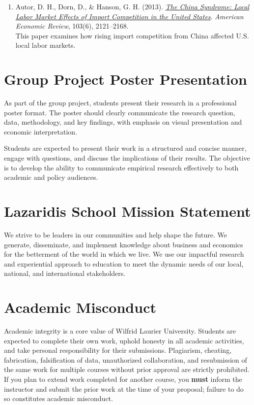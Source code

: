 \documentclass[11pt]{article}
\newcommand{\coloredsection}[1]{%
    \section*{\large\textcolor{sectioncolor}{#1}}%
}
\begin{document}
\begin{enumerate}
    \item Autor, D. H., Dorn, D., \& Hanson, G. H. (2013). 
    \href{https://www.aeaweb.org/articles?id=10.1257/aer.103.6.2121}
    {\textit{The China Syndrome: Local Labor Market Effects of Import Competition in the United States}}. 
    \textit{American Economic Review}, 103(6), 2121--2168. \\
    This paper examines how rising import competition from China affected U.S. local labor markets.
\end{enumerate}



\coloredsection{Group Project Poster Presentation}

As part of the group project, students present their research in a professional poster format. The poster should clearly communicate the research question, data, methodology, and key findings, with emphasis on visual presentation and economic interpretation.

Students are expected to present their work in a structured and concise manner, engage with questions, and discuss the implications of their results. The objective is to develop the ability to communicate empirical research effectively to both academic and policy audiences.


\coloredsection{Lazaridis School Mission Statement}

We strive to be leaders in our communities and help shape the future. We generate, disseminate, and implement knowledge about business and economics for the betterment of the world in which we live. We use our impactful research and experiential approach to education to meet the dynamic needs of our local, national, and international stakeholders.



\coloredsection{Academic Misconduct}

Academic integrity is a core value of Wilfrid Laurier University. Students are expected to 
complete their own work, uphold honesty in all academic activities, and take personal 
responsibility for their submissions. Plagiarism, cheating, fabrication, falsification of data, unauthorized collaboration, and 
resubmission of the same work for multiple courses without prior approval are strictly 
prohibited. If you plan to extend work completed for another course, you 
\textbf{must} inform the instructor and submit the prior work at the time of your proposal; 
failure to do so constitutes academic misconduct.
\end{document}
